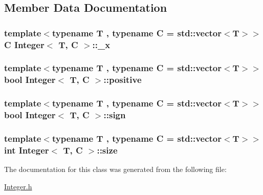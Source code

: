\subsection{Member Data Documentation}
\hypertarget{class_integer_a19f83aa8d5d86634885eb63d15bcdb6d}{
\subsubsection[{\-\_\-x}]{\setlength{\rightskip}{0pt plus 5cm}template$<$typename T , typename C  = std\-::vector$<$\-T$>$$>$ C {\bf Integer}$<$ T, C $>$\-::\-\_\-x\hspace{0.3cm}{\ttfamily [private]}}}\label{class_integer_a19f83aa8d5d86634885eb63d15bcdb6d}
\hypertarget{class_integer_af0750e482d739e0d2ebb7185c6b22fc2}{
\subsubsection[{positive}]{\setlength{\rightskip}{0pt plus 5cm}template$<$typename T , typename C  = std\-::vector$<$\-T$>$$>$ bool {\bf Integer}$<$ T, C $>$\-::positive\hspace{0.3cm}{\ttfamily [private]}}}\label{class_integer_af0750e482d739e0d2ebb7185c6b22fc2}
\hypertarget{class_integer_a15f88a897d21af49d5cc5910ce65be84}{
\subsubsection[{sign}]{\setlength{\rightskip}{0pt plus 5cm}template$<$typename T , typename C  = std\-::vector$<$\-T$>$$>$ bool {\bf Integer}$<$ T, C $>$\-::sign\hspace{0.3cm}{\ttfamily [private]}}}\label{class_integer_a15f88a897d21af49d5cc5910ce65be84}
\hypertarget{class_integer_a9fc5e657b8c50cbf7c13f095b060dee9}{
\subsubsection[{size}]{\setlength{\rightskip}{0pt plus 5cm}template$<$typename T , typename C  = std\-::vector$<$\-T$>$$>$ int {\bf Integer}$<$ T, C $>$\-::size\hspace{0.3cm}{\ttfamily [private]}}}\label{class_integer_a9fc5e657b8c50cbf7c13f095b060dee9}


The documentation for this class was generated from the following file\-:\begin{DoxyCompactItemize}
\item 
\hyperlink{_integer_8h}{Integer.\-h}\end{DoxyCompactItemize}
